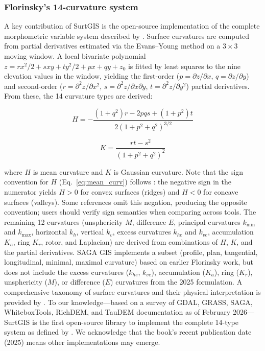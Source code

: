 \documentclass[preprint,review,12pt,authoryear]{elsarticle}
\begin{document}
\subsubsection{Florinsky's 14-curvature system}

A key contribution of SurtGIS is the open-source implementation of the complete morphometric variable system described by \citet{florinsky2025}. Surface curvatures are computed from partial derivatives estimated via the Evans--Young method \citep{evans1972} on a $3\times3$ moving window. A local bivariate polynomial $z = rx^2/2 + sxy + ty^2/2 + px + qy + z_0$ is fitted by least squares to the nine elevation values in the window, yielding the first-order ($p = \partial z/\partial x$, $q = \partial z/\partial y$) and second-order ($r = \partial^2 z/\partial x^2$, $s = \partial^2 z/\partial x \partial y$, $t = \partial^2 z/\partial y^2$) partial derivatives. From these, the 14 curvature types are derived:

\begin{equation}
H = -\frac{(1+q^2)r - 2pqs + (1+p^2)t}{2(1+p^2+q^2)^{3/2}}
\label{eq:mean_curv}
\end{equation}

\begin{equation}
K = \frac{rt - s^2}{(1+p^2+q^2)^2}
\label{eq:gauss_curv}
\end{equation}

\noindent where $H$ is mean curvature and $K$ is Gaussian curvature. Note that the sign convention for $H$ (Eq.~\ref{eq:mean_curv}) follows \citet{florinsky2025}: the negative sign in the numerator yields $H > 0$ for convex surfaces (ridges) and $H < 0$ for concave surfaces (valleys). Some references omit this negation, producing the opposite convention; users should verify sign semantics when comparing across tools. The remaining 12 curvatures (unsphericity $M$, difference $E$, principal curvatures $k_{\min}$ and $k_{\max}$, horizontal $k_h$, vertical $k_v$, excess curvatures $k_{he}$ and $k_{ve}$, accumulation $K_a$, ring $K_r$, rotor, and Laplacian) are derived from combinations of $H$, $K$, and the partial derivatives. SAGA GIS implements a subset (profile, plan, tangential, longitudinal, minimal, maximal curvature) based on earlier Florinsky work, but does not include the excess curvatures ($k_{he}$, $k_{ve}$), accumulation ($K_a$), ring ($K_r$), unsphericity ($M$), or difference ($E$) curvatures from the 2025 formulation. A comprehensive taxonomy of surface curvatures and their physical interpretation is provided by \citet{minar2020}. To our knowledge---based on a survey of GDAL, GRASS, SAGA, WhiteboxTools, RichDEM, and TauDEM documentation as of February 2026---SurtGIS is the first open-source library to implement the complete 14-type system as defined by \citet{florinsky2025}. We acknowledge that the book's recent publication date (2025) means other implementations may emerge.
\end{document}

